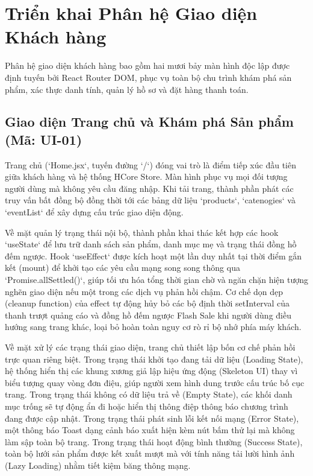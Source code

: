 \section{Triển khai Phân hệ Giao diện Khách hàng}
Phân hệ giao diện khách hàng bao gồm hai mươi bảy màn hình độc lập được định tuyến bởi React Router DOM, phục vụ toàn bộ chu trình khám phá sản phẩm, xác thực danh tính, quản lý hồ sơ và đặt hàng thanh toán.

\subsection{Giao diện Trang chủ và Khám phá Sản phẩm (Mã: UI-01)}
Trang chủ (`Home.jsx`, tuyến đường `/`) đóng vai trò là điểm tiếp xúc đầu tiên giữa khách hàng và hệ thống HCore Store. Màn hình phục vụ mọi đối tượng người dùng mà không yêu cầu đăng nhập. Khi tải trang, thành phần phát các truy vấn bất đồng bộ đồng thời tới các bảng dữ liệu `products`, `catenogies` và `eventList` để xây dựng cấu trúc giao diện động.

Về mặt quản lý trạng thái nội bộ, thành phần khai thác kết hợp các hook `useState` để lưu trữ danh sách sản phẩm, danh mục mẹ và trạng thái đồng hồ đếm ngược. Hook `useEffect` được kích hoạt một lần duy nhất tại thời điểm gắn kết (mount) để khởi tạo các yêu cầu mạng song song thông qua `Promise.allSettled()`, giúp tối ưu hóa tổng thời gian chờ và ngăn chặn hiện tượng nghẽn giao diện nếu một trong các dịch vụ phản hồi chậm. Cơ chế dọn dẹp (cleanup function) của effect tự động hủy bỏ các bộ định thời setInterval của thanh trượt quảng cáo và đồng hồ đếm ngược Flash Sale khi người dùng điều hướng sang trang khác, loại bỏ hoàn toàn nguy cơ rò rỉ bộ nhớ phía máy khách.

Về mặt xử lý các trạng thái giao diện, trang chủ thiết lập bốn cơ chế phản hồi trực quan riêng biệt. Trong trạng thái khởi tạo đang tải dữ liệu (Loading State), hệ thống hiển thị các khung xương giả lập hiệu ứng động (Skeleton UI) thay vì biểu tượng quay vòng đơn điệu, giúp người xem hình dung trước cấu trúc bố cục trang. Trong trạng thái không có dữ liệu trả về (Empty State), các khối danh mục trống sẽ tự động ẩn đi hoặc hiển thị thông điệp thông báo chương trình đang được cập nhật. Trong trạng thái phát sinh lỗi kết nối mạng (Error State), một thông báo Toast dạng cảnh báo xuất hiện kèm nút bấm thử lại mà không làm sập toàn bộ trang. Trong trạng thái hoạt động bình thường (Success State), toàn bộ lưới sản phẩm được kết xuất mượt mà với tính năng tải lười hình ảnh (Lazy Loading) nhằm tiết kiệm băng thông mạng.

